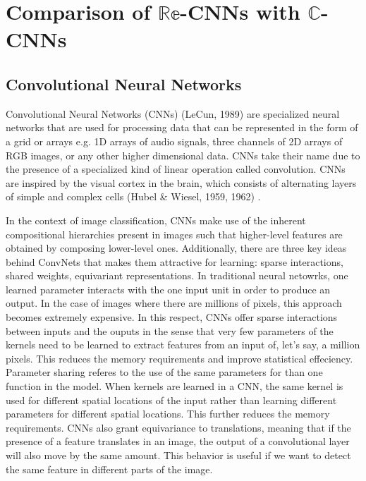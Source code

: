 \chapter{Comparison of $\mathbb{Re}$-CNNs with $\mathbb{C}$-CNNs}\label{chap:meth}
 
 
 \section{Convolutional Neural Networks}
 
 Convolutional Neural Networks (CNNs) (LeCun, 1989) \cite{lecun1989backpropagation} are specialized neural networks that are used for processing data that can be represented in the form of a grid or arrays e.g. 1D arrays of audio signals, three channels of 2D arrays of RGB images, or any other higher dimensional data. CNNs take their name due to the presence of a specialized kind of linear operation called convolution. CNNs are inspired by the visual cortex in the brain, which consists of alternating layers of simple and complex cells  (Hubel \& Wiesel, 1959, 1962) \cite{hubel1959receptive}\cite{hubel1962receptive}. 
 
In the context of image classification, CNNs make use of the inherent compositional hierarchies present in images such that higher-level features are obtained by composing lower-level ones. Additionally, there are three key ideas behind ConvNets that makes them attractive for learning: sparse interactions, shared weights, equivariant representations. In traditional neural netowrks, one learned parameter interacts with the one input unit in order to produce an output. In the case of images where there are millions of pixels, this approach becomes extremely expensive. In this respect, CNNs offer sparse interactions between inputs and the ouputs in the sense that very few parameters of the kernels need to be learned to extract features from an input of, let's say, a million pixels. This reduces the memory requirements and improve statistical effeciency. Parameter sharing referes to the use of the same parameters for than one function in the model. When kernels are learned in a CNN, the same kernel is used for different spatial locations of the input rather than learning different parameters for different spatial locations. This further reduces the memory requirements. CNNs also grant equivariance to translations, meaning that if the presence of a feature translates in an image, the output of a convolutional layer will also move by the same amount. This behavior is useful if we want to detect the same feature in different parts of the image.\cite{DeepLearning}
 
